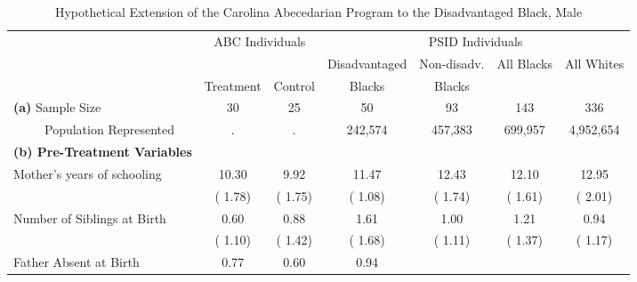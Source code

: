 \begin{table}[htbp]
\caption{\label{tab:tabmal_abc} Hypothetical Extension of the Carolina Abecedarian Program to the Disadvantaged Black, Male}\medskip
\footnotesize  \begin{center} \begin{tabular}{lcccccccc}  \hline \hline    
&\multicolumn{2}{c}{ABC Individuals} &\multicolumn{6}{c}{PSID Individuals}  \\[0.05cm]  \cline{2-3} \cline{5-9}   
 & \multicolumn{2}{c}{    }  & \multicolumn{2}{c}{Disadvantaged}  & \multicolumn{1}{c}{Non-disadv.}  & \multicolumn{2}{c}{All Blacks}  & \multicolumn{1}{c}{All Whites} \\  & \multicolumn{1}{c}{Treatment}  & \multicolumn{1}{c}{Control}  & \multicolumn{2}{c}{Blacks}  & \multicolumn{1}{c}{Blacks}  & \multicolumn{2}{c}{ } \\   \hline   
\textbf{(a)} Sample Size &30&           25& \multicolumn{2}{c}{           50} & \multicolumn{1}{c}{           93} &
\multicolumn{2}{c}{          143} &
\multicolumn{1}{c}{          336} 
 \\[0.05cm] 
\ \ \ \ \ Population Represented &.&            .& \multicolumn{2}{c}{      242,574} & \multicolumn{1}{c}{      457,383} &
\multicolumn{2}{c}{      699,957} &
\multicolumn{1}{c}{    4,952,654} 
 \\[0.2cm] \hline
\textbf{(b) Pre-Treatment Variables}  \\[0.2cm] 
Mother's years of schooling &        10.30 &         9.92 & \multicolumn{2}{c}{        11.47} &
\multicolumn{1}{c}{        12.43} &
\multicolumn{2}{c}{        12.10} &
\multicolumn{1}{c}{        12.95} 
 \\[0.05cm]  
 & (        1.78) & (        1.75) & \multicolumn{2}{c}{(        1.08)} &
\multicolumn{1}{c}{(        1.74)} &
\multicolumn{2}{c}{(        1.61)} &
\multicolumn{1}{c}{(        2.01)} 
 \\[0.2cm]  
Number of Siblings at Birth &         0.60 &         0.88 & \multicolumn{2}{c}{         1.61} &
\multicolumn{1}{c}{         1.00} &
\multicolumn{2}{c}{         1.21} &
\multicolumn{1}{c}{         0.94} 
 \\[0.05cm]  
 & (        1.10) & (        1.42) & \multicolumn{2}{c}{(        1.68)} &
\multicolumn{1}{c}{(        1.11)} &
\multicolumn{2}{c}{(        1.37)} &
\multicolumn{1}{c}{(        1.17)} 
 \\[0.2cm]  
Father Absent at Birth &         0.77 &         0.60 & \multicolumn{2}{c}{         0.94} &

\end{tabular}
\end{center}
\end{table}
